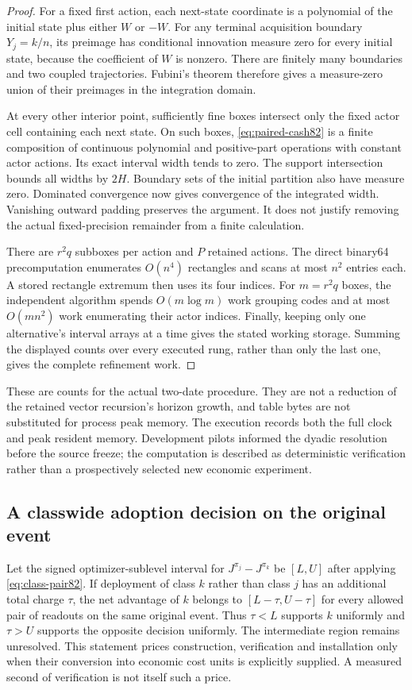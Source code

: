 \begin{proof}
For a fixed first action, each next-state coordinate is a polynomial of the initial state plus either $W$ or $-W$. For any terminal acquisition boundary $Y_j=k/n$, its preimage has conditional innovation measure zero for every initial state, because the coefficient of $W$ is nonzero. There are finitely many boundaries and two coupled trajectories. Fubini's theorem therefore gives a measure-zero union of their preimages in the integration domain.

At every other interior point, sufficiently fine boxes intersect only the fixed actor cell containing each next state. On such boxes, \eqref{eq:paired-cash82} is a finite composition of continuous polynomial and positive-part operations with constant actor actions. Its exact interval width tends to zero. The support intersection bounds all widths by $2H$. Boundary sets of the initial partition also have measure zero. Dominated convergence now gives convergence of the integrated width. Vanishing outward padding preserves the argument. It does not justify removing the actual fixed-precision remainder from a finite calculation.

There are $r^2q$ subboxes per action and $P$ retained actions. The direct binary64 precomputation enumerates $O(n^4)$ rectangles and scans at most $n^2$ entries each. A stored rectangle extremum then uses its four indices. For $m=r^2q$ boxes, the independent algorithm spends $O(m\log m)$ work grouping codes and at most $O(mn^2)$ work enumerating their actor indices. Finally, keeping only one alternative's interval arrays at a time gives the stated working storage. Summing the displayed counts over every executed rung, rather than only the last one, gives the complete refinement work.
\end{proof}

These are counts for the actual two-date procedure. They are not a reduction of the retained vector recursion's horizon growth, and table bytes are not substituted for process peak memory. The execution records both the full clock and peak resident memory. Development pilots informed the dyadic resolution before the source freeze; the computation is described as deterministic verification rather than a prospectively selected new economic experiment.

\subsection{A classwide adoption decision on the original event}
Let the signed optimizer-sublevel interval for $J^{\pi_j}-J^{\pi_k}$ be $[L,U]$ after applying \eqref{eq:class-pair82}. If deployment of class $k$ rather than class $j$ has an additional total charge $\tau$, the net advantage of $k$ belongs to $[L-\tau,U-\tau]$ for every allowed pair of readouts on the same original event. Thus $\tau<L$ supports $k$ uniformly and $\tau>U$ supports the opposite decision uniformly. The intermediate region remains unresolved. This statement prices construction, verification and installation only when their conversion into economic cost units is explicitly supplied. A measured second of verification is not itself such a price.

